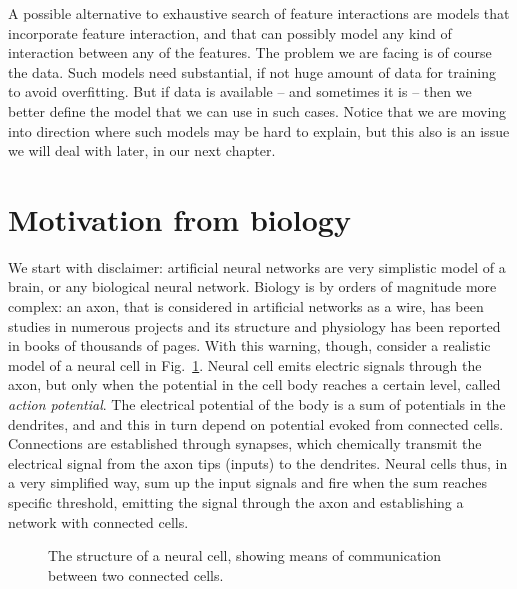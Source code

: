 \begin{refsection}
A possible alternative to exhaustive search of feature interactions are models that incorporate feature interaction, and that can possibly model any kind of interaction between any of the features. The problem we are facing is of course the data. Such models need substantial, if not huge amount of data for training to avoid overfitting. But if data is available -- and sometimes it is -- then we better define the model that we can use in such cases. Notice that we are moving into direction where such models may be hard to explain, but this also is an issue we will deal with later, in our next chapter.


\section{Motivation from biology}

We start with disclaimer: artificial neural networks are very simplistic model of a brain, or any biological neural network. Biology is by orders of magnitude more complex: an axon, that is considered in artificial networks as a wire, has been studies in numerous projects and its structure and physiology has been reported in books of thousands of pages. With this warning, though, consider a realistic model of a neural cell in Fig.~\ref{fig:neural-cell}. Neural cell emits electric signals through the axon, but only when the potential in the cell body reaches a certain level, called {\em action potential}. The electrical potential of the body is a sum of potentials in the dendrites, and and this in turn depend on potential evoked from connected cells. Connections are established through synapses, which chemically transmit the electrical signal from the axon tips (inputs) to the dendrites. Neural cells thus, in a very simplified way, sum up the input signals and fire when the sum reaches specific threshold, emitting the signal through the axon and establishing a network with connected cells.

\begin{figure}
\caption{The structure of a neural cell, showing means of communication between two connected cells.}
\label{fig:neural-cell}
\end{figure}



\end{refsection}
